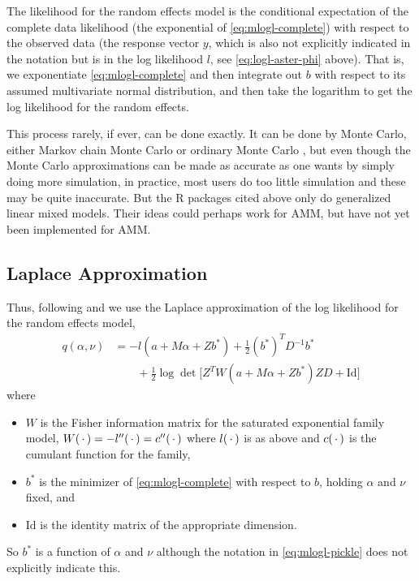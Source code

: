 The likelihood for the random effects model is the conditional expectation
of the complete data likelihood (the exponential of \eqref{eq:mlogl-complete})
with respect to the observed data (the response vector $y$, which is also
not explicitly indicated in the notation but is in the log likelihood $l$,
see \eqref{eq:logl-aster-phi} above).  That is, we exponentiate
\eqref{eq:mlogl-complete} and then integrate out $b$ with respect to its
assumed multivariate normal distribution, and then take the logarithm to get
the log likelihood for the random effects.

This process rarely, if ever, can be done exactly.
It can be done by Monte Carlo, either Markov chain Monte Carlo
\citep{thompson-guo,geyer-1994-jrssb} or ordinary Monte Carlo
\citep*{sung-geyer,bernor-package,glmm,glmm-package}, but even though
the Monte Carlo approximations can be made as accurate as one wants by
simply doing more simulation, in practice, most users do too little simulation
and these may be quite inaccurate.  But the R packages cited above
\citep{bernor-package,glmm-package} only do
generalized linear mixed models.  Their ideas could perhaps
work for AMM, but have not yet been implemented for AMM.

\subsection{Laplace Approximation}
\label{sec:laplace-approximation}

Thus, following \citet{breslow-clayton} and \citet{reaster}
we use the Laplace approximation
of the log likelihood for the random effects model,
\begin{equation} \label{eq:mlogl-pickle}
\begin{split}
   q(\alpha, \nu)
   & =
   - l(a + M \alpha + Z b^*) + \tfrac{1}{2} (b^*)^T D^{-1} b^*
   \\
   & \qquad
   + \tfrac{1}{2} \log \det \bigl[ Z^T W(a + M \alpha + Z b^*) Z D + \text{Id}
   \bigr]
\end{split}
\end{equation}
where
\begin{itemize}
\item $W$ is the Fisher information matrix for the saturated exponential
    family model, $W(\,\cdot\,) = - l''(\,\cdot\,) = c''(\,\cdot\,)$
    where $l(\,\cdot\,)$
    is as above and $c(\,\cdot\,)$ is the cumulant function for the family,
\item $b^*$ is the minimizer of \eqref{eq:mlogl-complete} with respect to $b$,
    holding $\alpha$ and $\nu$ fixed, and
\item $\text{Id}$ is the identity matrix of the appropriate dimension.
\end{itemize}
So $b^*$ is a function of $\alpha$ and $\nu$ although the notation in
\eqref{eq:mlogl-pickle} does not explicitly indicate this.

